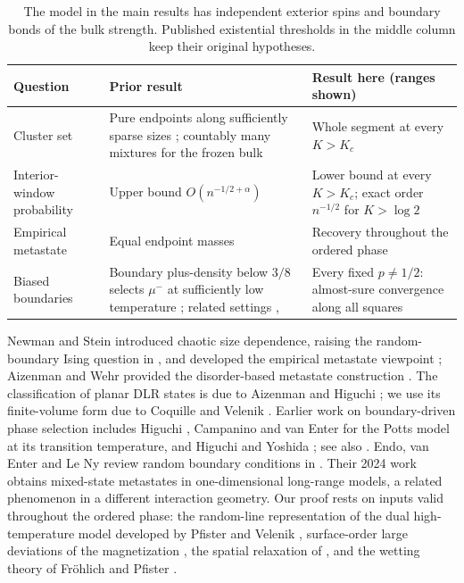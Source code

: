 \begin{table}[ht]
\centering\small
\begin{tabular}{@{}>{\raggedright\arraybackslash}p{}>{\raggedright\arraybackslash}p{}>{\raggedright\arraybackslash}p{}@{}}
\toprule
Question & Prior result & Result here (ranges shown)\\
\midrule
Cluster set & Pure endpoints along sufficiently sparse sizes \cite[Theorem~3.1]{vENS05}; countably many mixtures for the frozen bulk \cite{EMN02} & Whole segment at every $K>K_c$\\
Interior-window probability & Upper bound $O(n^{-1/2+\alpha})$ \cite[Proposition~3.5]{vENS05} & Lower bound at every $K>K_c$; exact order $n^{-1/2}$ for $K>\log2$\\
Empirical metastate & Equal endpoint masses \cite[Theorem~3.4]{vENS05} & Recovery throughout the ordered phase\\
Biased boundaries & Boundary plus-density below $3/8$ selects $\mu^-$ at sufficiently low temperature \cite[Theorem~1]{Higuchi78}; related settings \cite{EMN02,CampaninoEnter}, \cite[Section~2]{vENS06} & Every fixed $p\ne1/2$: almost-sure convergence along all squares\\
\bottomrule
\end{tabular}
\caption{The model in the main results has independent exterior spins and boundary bonds of the bulk strength. Published existential thresholds in the middle column keep their original hypotheses.}\label{tab:landscape}
\end{table}

Newman and Stein introduced chaotic size dependence, raising the random-boundary Ising question in \cite{NS92}, and developed the empirical metastate viewpoint \cite{NewmanStein}; Aizenman and Wehr provided the disorder-based metastate construction \cite{AizenmanWehr}. The classification of planar DLR states is due to Aizenman and Higuchi \cite{Aizenman,Higuchi81}; we use its finite-volume form due to Coquille and Velenik \cite{CV}. Earlier work on boundary-driven phase selection includes Higuchi \cite{Higuchi78}, Campanino and van Enter \cite{CampaninoEnter} for the Potts model at its transition temperature, and Higuchi and Yoshida \cite{HY97}; see also \cite[Section~2]{vENS06}. Endo, van Enter and Le Ny review random boundary conditions in \cite{EEL19}. Their 2024 work \cite{EEL24} obtains mixed-state metastates in one-dimensional long-range models, a related phenomenon in a different interaction geometry. Our proof rests on inputs valid throughout the ordered phase: the random-line representation of the dual high-temperature model developed by Pfister and Velenik \cite{PV97,PV99}, surface-order large deviations of the magnetization \cite{Ioffe95,Schonmann87,CCS87}, the spatial relaxation of \cite{BLP81,CCS87}, and the wetting theory of Fr\"ohlich and Pfister \cite{FP1,FP2}.

